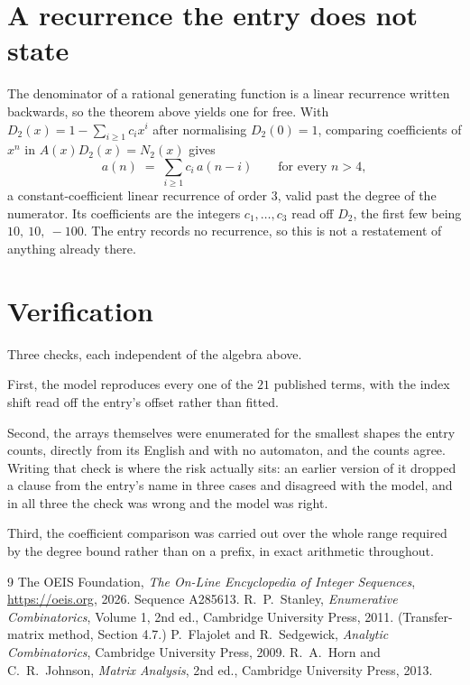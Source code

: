 \documentclass[11pt,a4paper]{article}
\theoremstyle{plain}
\theoremstyle{definition}
\begin{document}
\section{A recurrence the entry does not state}

The denominator of a rational generating function is a linear recurrence written backwards, so
the theorem above yields one for free. With $D_2(x)=1-\sum_{i\ge1}c_ix^i$ after normalising
$D_2(0)=1$, comparing coefficients of $x^n$ in $A(x)D_2(x)=N_2(x)$ gives
\[
a(n)\;=\;\sum_{i\ge1}c_i\,a(n-i)\qquad\text{for every }n>4,
\]
a constant-coefficient linear recurrence of order $3$, valid past the degree of the
numerator. Its coefficients are the integers $c_1,\dots,c_{3}$ read off $D_2$, the first few being $10,\ 10,\ -100$. The entry records no recurrence, so this is not a restatement of anything
already there.

\section{Verification}

Three checks, each independent of the algebra above.

First, the model reproduces every one of the $21$ published terms, with the index shift
read off the entry's offset rather than fitted.

Second, the arrays themselves were enumerated for the smallest shapes the entry counts,
directly from its English and with no automaton, and the counts agree. Writing that check is
where the risk actually sits: an earlier version of it dropped a clause from the entry's name
in three cases and disagreed with the model, and in all three the check was wrong and the model
was right.

Third, the coefficient comparison was carried out over the whole range required by the degree
bound rather than on a prefix, in exact arithmetic throughout.

\begin{thebibliography}{9}
 The OEIS Foundation, \emph{The On-Line Encyclopedia of Integer
Sequences}, \url{https://oeis.org}, 2026. Sequence A285613.
 R.~P.~Stanley, \emph{Enumerative Combinatorics}, Volume 1, 2nd ed.,
Cambridge University Press, 2011. (Transfer-matrix method, Section 4.7.)
 P.~Flajolet and R.~Sedgewick, \emph{Analytic Combinatorics}, Cambridge
University Press, 2009.
 R.~A.~Horn and C.~R.~Johnson, \emph{Matrix Analysis}, 2nd ed., Cambridge
University Press, 2013.
\end{thebibliography}
\end{document}
